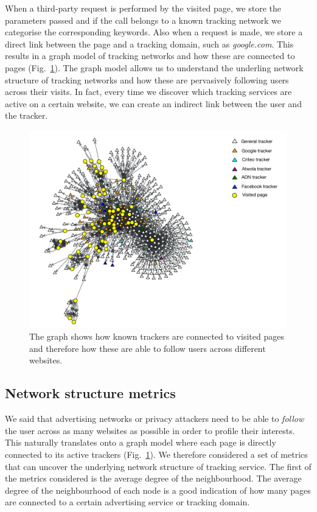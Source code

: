 When a third-party request is performed by the visited page, we store the parameters passed and if the call belongs to a known tracking network we categorise the corresponding keywords. Also when a request is made, we store a direct link between the page and a tracking domain, such as \emph{google.com}. This results in a graph model of tracking networks and how these are connected to pages (Fig.~\ref{fig:graph-map}). The graph model allows us to understand the underling network structure of tracking networks and how these are pervasively following users across their visits. In fact, every time we discover which tracking services are active on a certain website, we can create an indirect link between the user and the tracker.


\begin{figure}
\includegraphics[width=\textwidth]{figures/graph-map.png}
\caption[Connections between trackers and visited pages]{The graph shows how known trackers are connected to visited pages and therefore how these are able to follow users across different websites.
\label{fig:graph-map}}
\end{figure}

\subsection{Network structure metrics}

We said that advertising networks or privacy attackers need to be able to \emph{follow} the user across as many websites as possible in order to profile their interests. This naturally translates onto a graph model where each page is directly connected to its active trackers (Fig.~\ref{fig:graph-map}).
We therefore considered a set of metrics that can uncover the underlying network structure of tracking service. The first of the metrics considered is the average degree of the neighbourhood. The average degree of the neighbourhood of each node is a good indication of how many pages are connected to a certain advertising service or tracking domain.

